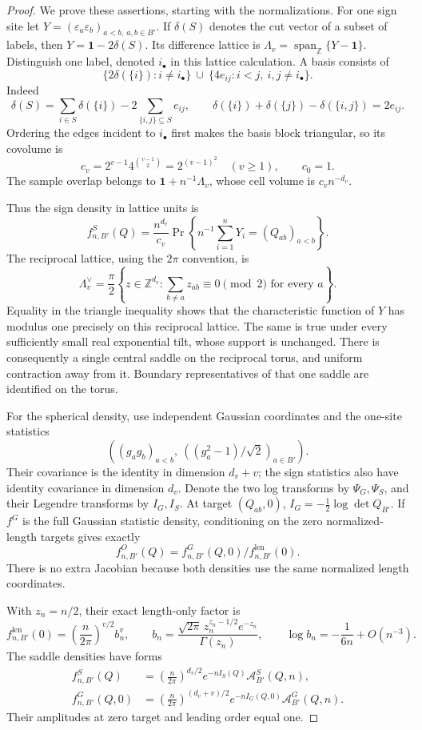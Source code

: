 \begin{proof}
We prove these assertions, starting with the normalizations.  For one
sign site let
\(Y=(\varepsilon_a\varepsilon_b)_{a<b,\ a,b\in B'}\).
If \(\delta(S)\) denotes the cut vector of a subset of labels, then
\(Y=\mathbf1-2\delta(S)\).  Its difference lattice is
\(\Lambda_v=\operatorname{span}_{\mathbb Z}\{Y-\mathbf1\}\).
Distinguish one label, denoted \(i_\bullet\) in this lattice calculation.
A basis consists of
\[
 \{2\delta(\{i\}):i\ne i_\bullet\}
 \ \cup\
 \{4e_{ij}:i<j,\ i,j\ne i_\bullet\}.
\]
Indeed
\[
 \delta(S)=\sum_{i\in S}\delta(\{i\})
       -2\sum_{\{i,j\}\subseteq S}e_{ij},\qquad
 \delta(\{i\})+\delta(\{j\})-\delta(\{i,j\})=2e_{ij}.
\]
Ordering the edges incident to \(i_\bullet\) first makes the basis block
triangular, so its covolume is
\[
 c_v=2^{v-1}4^{\binom{v-1}2}=2^{(v-1)^2}\quad(v\ge1),
 \qquad c_0=1.
\]
The sample overlap belongs to \(\mathbf1+n^{-1}\Lambda_v\), whose
cell volume is \(c_vn^{-d_v}\).

Thus the sign density in lattice units is
\[
 f^S_{n,B'}(Q)=\frac{n^{d_v}}{c_v}
    \Pr\left\{n^{-1}\sum_{i=1}^nY_i=(Q_{ab})_{a<b}\right\}.
\]
The reciprocal lattice, using the \(2\pi\) convention, is
\[
 \Lambda_v^\vee=\frac\pi2
 \left\{z\in\mathbb Z^{d_v}:
           \sum_{b\ne a}z_{ab}\equiv0\pmod2
                           \text{ for every }a\right\}.
\]
Equality in the triangle inequality shows that the characteristic
function of \(Y\) has modulus one precisely on this reciprocal lattice.
The same is true under every sufficiently small real exponential tilt,
whose support is unchanged.  There is consequently a single central
saddle on the reciprocal torus, and uniform contraction away from it.
Boundary representatives of that one saddle are identified on the torus.

For the spherical density, use independent Gaussian coordinates and
the one-site statistics
\[
 \left((g_ag_b)_{a<b},\ ((g_a^2-1)/\sqrt2)_{a\in B'}\right).
\]
Their covariance is the identity in dimension \(d_v+v\); the sign
statistics also have identity covariance in dimension \(d_v\).
Denote the two log transforms by \(\Psi_G,\Psi_S\), and their Legendre
transforms by \(I_G,I_S\).  At target \((Q_{ab},0)\),
\(I_G=-\tfrac12\log\det Q_{B'}\).  If \(f^G\) is the full Gaussian
statistic density, conditioning on the zero normalized-length targets
gives exactly
\[
 f^O_{n,B'}(Q)=f^G_{n,B'}(Q,0)/f^{\mathrm{len}}_{n,B'}(0).
\]
There is no extra Jacobian because both densities use the same normalized
length coordinates.

With \(z_n=n/2\), their exact length-only factor is
\[
 f^{\mathrm{len}}_{n,B'}(0)
    =\left(\frac n{2\pi}\right)^{v/2}b_n^v,
 \qquad
 b_n=\frac{\sqrt{2\pi}\,z_n^{z_n-1/2}e^{-z_n}}{\Gamma(z_n)},
 \qquad \log b_n=-\frac1{6n}+O(n^{-3}).
\]
The saddle densities have forms
\[
 \begin{split}
 f^S_{n,B'}(Q)&=\left(\frac n{2\pi}\right)^{d_v/2}
                 e^{-nI_S(Q)}\mathcal A^S_{B'}(Q,n),\\
 f^G_{n,B'}(Q,0)&=\left(\frac n{2\pi}\right)^{(d_v+v)/2}
                 e^{-nI_G(Q,0)}\mathcal A^G_{B'}(Q,n).
 \end{split}
\]
Their amplitudes at zero target and leading order equal one.


\end{proof}
